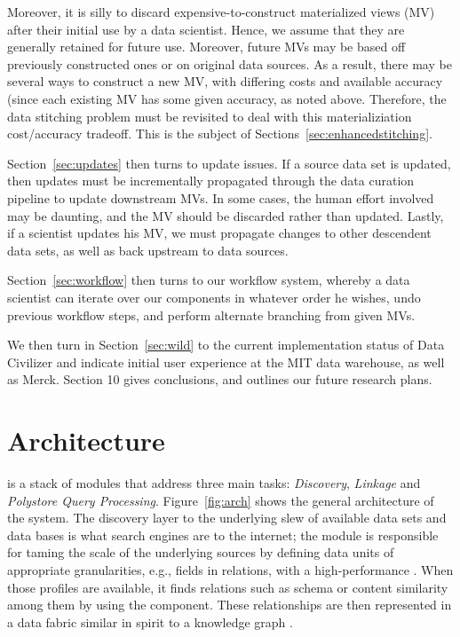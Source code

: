Moreover, it is silly to discard expensive-to-construct materialized views (MV)
after their initial use by a data scientist.  Hence, we assume that they are
generally retained for future use.  Moreover, future MVs may be based off
previously constructed ones or on original data sources.  As a result, there may
be several ways to construct a new MV, with differing costs and available
accuracy (since each existing MV has some given accuracy, as noted above.
Therefore, the data stitching problem must be revisited to deal with this
materializiation cost/accuracy tradeoff.  This is the subject of Sections~\ref{sec:enhancedstitching}.

Section~\ref{sec:updates} then turns to update issues.   If a source data set is updated, then
updates must be incrementally propagated through the data curation pipeline to
update downstream MVs.  In some cases, the human effort involved may be
daunting, and the MV should be discarded rather than updated.  Lastly, if a
scientist updates his MV, we must propagate changes to other descendent data
sets, as well as back upstream to data sources. 

Section~\ref{sec:workflow} then turns to our workflow system, whereby a data scientist can
iterate over our components in whatever order he wishes, undo previous workflow
steps, and perform alternate branching from given MVs. 

We then turn in Section~\ref{sec:wild} to the current implementation status of Data Civilizer
and indicate initial user experience at the MIT data warehouse, as well as
Merck.  Section 10 gives conclusions, and outlines our future research plans.


\section{Architecture}

\dcv is a stack of modules that address three main tasks: {\em Discovery}, {\em
Linkage} and  {\em Polystore Query Processing}. Figure~\ref{fig:arch} shows the
general architecture of the \dcv system. The discovery layer to the underlying
slew of available data sets and data bases is what search engines are to the
internet; the module is responsible for taming the scale of the underlying
sources by defining data units of appropriate granularities, e.g., fields in
relations, with a high-performance . When those profiles are
available, it finds relations such as schema or content similarity among them by
using the  component. These relationships are then
represented in a data fabric similar in spirit to a knowledge graph
\cite{DBLP:conf/semweb/AuerBKLCI07,DBLP:conf/sigmod/BollackerEPST08,DBLP:conf/www/SuchanekKW07}.

